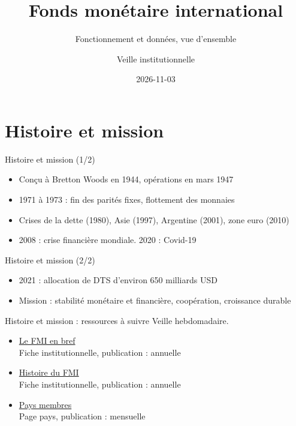 \documentclass[aspectratio=169,11pt]{beamer}
\title{Fonds monétaire international}
\subtitle{Fonctionnement et données, vue d'ensemble}
\author{Veille institutionnelle}
\date{2026-11-03}
\begin{document}
\begin{frame}\titlepage\end{frame}

\section{Histoire et mission}
\begin{frame}{Histoire et mission (1/2)}
\begin{itemize}
\item Conçu à Bretton Woods en 1944, opérations en mars 1947
\item 1971 à 1973 : fin des parités fixes, flottement des monnaies
\item Crises de la dette (1980), Asie (1997), Argentine (2001), zone euro (2010)
\item 2008 : crise financière mondiale. 2020 : Covid-19
\end{itemize}
\end{frame}

\begin{frame}{Histoire et mission (2/2)}
\begin{itemize}
\item 2021 : allocation de DTS d'environ 650 milliards USD
\item Mission : stabilité monétaire et financière, coopération, croissance durable
\end{itemize}
\end{frame}

\begin{frame}{Histoire et mission : ressources à suivre}
\small
Veille hebdomadaire.
\begin{itemize}
\item \href{https://www.imf.org/en/About/Factsheets/Sheets/2023/IMF-at-a-glance}{Le FMI en bref}\\{\footnotesize Fiche institutionnelle, publication : annuelle}
\item \href{https://www.imf.org/en/About/Factsheets/Sheets/2016/08/01/14/45/The-IMF-and-the-World-Bank}{Histoire du FMI}\\{\footnotesize Fiche institutionnelle, publication : annuelle}
\item \href{https://www.imf.org/en/Countries}{Pays membres}\\{\footnotesize Page pays, publication : mensuelle}
\end{itemize}
\end{frame}
\end{document}
